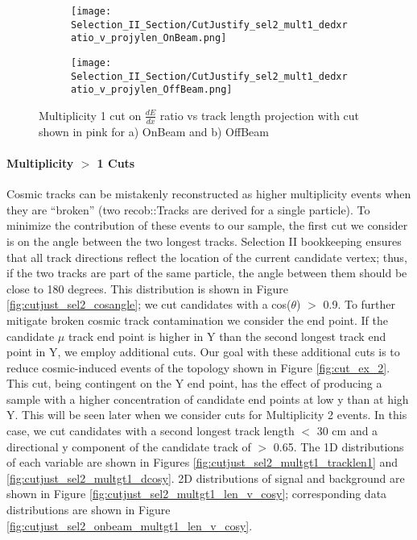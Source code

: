 \begin{figure}[t!]
\centering
\begin{subfigure}[t]{0.25\textwidth}
  \centering
  \texttt{[image: Selection\_II\_Section/CutJustify\_sel2\_mult1\_dedxratio\_v\_projylen\_OnBeam.png]}  
  \caption{ }
  \end{subfigure} 
  \hspace{1 mm}
  \begin{subfigure}[t]{0.25\textwidth}
    \centering
\texttt{[image: Selection\_II\_Section/CutJustify\_sel2\_mult1\_dedxratio\_v\_projylen\_OffBeam.png]}
  \caption{ }
  \end{subfigure} 
\caption{Multiplicity 1 cut on $\frac{dE}{dx}$ ratio vs track length projection with cut shown in pink for a) OnBeam and b) OffBeam }
\label{fig:cutjust_sel2_onbeam_mult1_dedxratio_v_leny}

\end{figure}

\clearpage
\paragraph{Multiplicity $>$ 1 Cuts}
Cosmic tracks can be mistakenly reconstructed as higher multiplicity events when they are ``broken'' (two recob::Tracks are derived for a single particle). To minimize the contribution of these events to our sample, the first cut we consider is on the angle between the two longest tracks. Selection II bookkeeping ensures that all track directions reflect the location of the current candidate vertex; thus, if the two tracks are part of the same particle, the angle between them should be close to 180 degrees. This distribution is shown in Figure \ref{fig:cutjust_sel2_cosangle}; we cut candidates with a cos($\theta$) $>$ 0.9.  To further mitigate broken cosmic track contamination we consider the end point.  If the candidate $\mu$ track end point is higher in Y than the second longest track end point in Y, we employ additional cuts. Our goal with these additional cuts is to reduce cosmic-induced events of the topology shown in Figure \ref{fig:cut_ex_2}. This cut, being contingent on the Y end point, has the effect of producing a sample with a higher concentration of candidate end points at low y than at high Y.  This will be seen later when we consider cuts for Multiplicity 2 events.  In this case, we cut candidates with a second longest track length $<$ 30 cm and a directional y component of the candidate track of $>$ 0.65. The 1D distributions of each variable are shown in Figures \ref{fig:cutjust_sel2_multgt1_tracklen1} and \ref{fig:cutjust_sel2_multgt1_dcosy}.  2D distributions of signal and background are shown in Figure \ref{fig:cutjust_sel2_multgt1_len_v_cosy}; corresponding data distributions are shown in Figure \ref{fig:cutjust_sel2_onbeam_multgt1_len_v_cosy}. 

